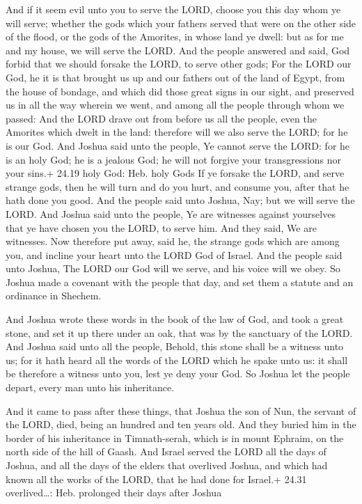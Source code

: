  And if it seem evil unto you to serve the LORD, choose you
this day whom ye will serve; whether the gods which your fathers served
that were on the other side of the flood, or the gods of the Amorites,
in whose land ye dwell: but as for me and my house, we will serve the
LORD.  And the people answered and said, God forbid that we
should forsake the LORD, to serve other gods;  For the LORD
our God, he it is that brought us up and our fathers out of the land of
Egypt, from the house of bondage, and which did those great signs in our
sight, and preserved us in all the way wherein we went, and among all
the people through whom we passed:  And the LORD drave out
from before us all the people, even the Amorites which dwelt in the
land: therefore will we also serve the LORD; for he is our God.
 And Joshua said unto the people, Ye cannot serve the LORD:
for he is an holy God; he is a jealous God; he will not forgive your
transgressions nor your sins.+ 24.19 holy God: Heb. holy Gods
 If ye forsake the LORD, and serve strange gods, then he
will turn and do you hurt, and consume you, after that he hath done you
good.  And the people said unto Joshua, Nay; but we will
serve the LORD.  And Joshua said unto the people, Ye are
witnesses against yourselves that ye have chosen you the LORD, to serve
him. And they said, We are witnesses.  Now therefore put
away, said he, the strange gods which are among you, and incline your
heart unto the LORD God of Israel.  And the people said
unto Joshua, The LORD our God will we serve, and his voice will we obey.
 So Joshua made a covenant with the people that day, and
set them a statute and an ordinance in Shechem.

 And Joshua wrote these words in the book of the law of
God, and took a great stone, and set it up there under an oak, that was
by the sanctuary of the LORD.  And Joshua said unto all the
people, Behold, this stone shall be a witness unto us; for it hath heard
all the words of the LORD which he spake unto us: it shall be therefore
a witness unto you, lest ye deny your God.  So Joshua let
the people depart, every man unto his inheritance.

 And it came to pass after these things, that Joshua the
son of Nun, the servant of the LORD, died, being an hundred and ten
years old.  And they buried him in the border of his
inheritance in Timnath-serah, which is in mount Ephraim, on the north
side of the hill of Gaash.  And Israel served the LORD all
the days of Joshua, and all the days of the elders that overlived
Joshua, and which had known all the works of the LORD, that he had done
for Israel.+ 24.31 overlived\ldots: Heb. prolonged their days after
Joshua

